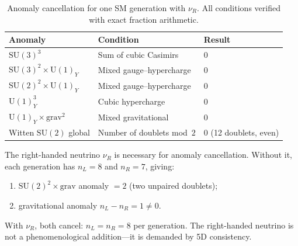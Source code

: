 \begin{table}[htbp]
\centering
\caption{Anomaly cancellation for one SM generation with $\nu_R$.  All conditions verified with exact fraction arithmetic.}
\label{tab:4-anomaly}
\small
\begin{tabular}{@{}lll@{}}
\toprule
Anomaly & Condition & Result \\
\midrule
$\mathrm{SU}(3)^3$ & Sum of cubic Casimirs & $0$ \\
$\mathrm{SU}(3)^2 \times \mathrm{U}(1)_Y$ & Mixed gauge--hypercharge & $0$ \\
$\mathrm{SU}(2)^2 \times \mathrm{U}(1)_Y$ & Mixed gauge--hypercharge & $0$ \\
$\mathrm{U}(1)_Y^3$ & Cubic hypercharge & $0$ \\
$\mathrm{U}(1)_Y \times \mathrm{grav}^2$ & Mixed gravitational & $0$ \\
Witten $\mathrm{SU}(2)$ global & Number of doublets mod~$2$ & $0$ (12 doublets, even) \\
\bottomrule
\end{tabular}
\end{table}

\begin{proposition}\label{prop:4-nuR-anomaly}
The right-handed neutrino $\nu_R$ is necessary for anomaly cancellation.  Without it, each generation has $n_L = 8$ and $n_R = 7$, giving:
\begin{enumerate}
  \item[(i)] $\mathrm{SU}(2)^2 \times \mathrm{grav}$ anomaly $= 2$ (two unpaired doublets);
  \item[(ii)] gravitational anomaly $n_L - n_R = 1 \neq 0$.
\end{enumerate}
With $\nu_R$, both cancel: $n_L = n_R = 8$ per generation.  The right-handed neutrino is not a phenomenological addition---it is demanded by 5D consistency.
\end{proposition}

